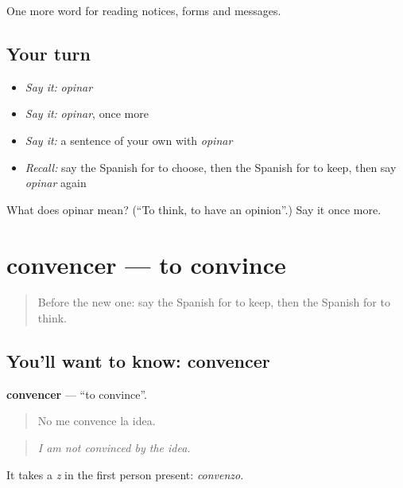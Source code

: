\begin{grammarlens}[title={What you've built}]
One more word for reading notices, forms and messages.
\end{grammarlens}

\subsection*{Your turn}
\begin{itemize}
\raggedright
  \item \emph{Say it:} \emph{opinar}
  \item \emph{Say it:} \emph{opinar}, once more
  \item \emph{Say it:} a sentence of your own with \emph{opinar}
  \item \emph{Recall:} say the Spanish for to choose, then the Spanish for to keep, then say \emph{opinar} again
\end{itemize}

\begin{tcolorbox}[breakable,colback=teal!4,colframe=teal!35!black,title={Before you move on}]
What does opinar mean? (\textquotedblleft{}To think, to have an opinion\textquotedblright{}.) Say it once more.
\end{tcolorbox}
\section[convencer]{convencer — to convince}

\label{lesson:ES-C493-convencer}



\begin{quote}
Before the new one: say the Spanish for to keep, then the Spanish for to think.
\end{quote}

\subsection*{You'll want to know: convencer}
\textbf{convencer} — \textquotedblleft{}to convince\textquotedblright{}.

\begin{quote}
No me convence la idea.
\end{quote}

\begin{quote}
\emph{I am not convinced by the idea.}
\end{quote}

It takes a \emph{z} in the first person present: \emph{convenzo}.

